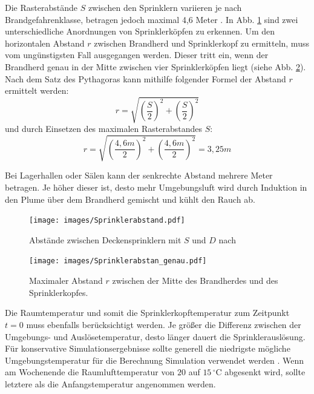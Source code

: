 Die Rasterabstände $S$ zwischen den Sprinklern variieren je nach Brandgefahrenklasse, betragen jedoch maximal 4,6 Meter \cite[S. 100]{VDS4001}. In Abb. \ref{fig:Sprinkleranordnung} sind zwei unterschiedliche Anordnungen von Sprinklerköpfen zu erkennen. 
Um den horizontalen Abstand $r$ zwischen Brandherd und Sprinklerkopf zu ermitteln, muss vom ungünstigsten Fall ausgegangen werden. Dieser tritt ein, wenn der Brandherd genau in der Mitte zwischen vier Sprinklerköpfen liegt (siehe Abb. \ref{fig:Sprinklerabstand_genau}). Nach dem Satz des Pythagoras kann mithilfe folgender Formel der Abstand $r$ ermittelt werden: 
\begin{equation}
    r=\sqrt{\left ( \frac{S}{2} \right )^2+ \left ( \frac{S}{2} \right )^2}
\end{equation}
und durch Einsetzen des maximalen Rasterabstandes $S$:
\begin{equation}
    r=\sqrt{\left ( \frac{4{,}6 m}{2} \right )^2+ \left ( \frac{4{,}6 m}{2} \right )^2}= 3{,}25 m
\end{equation}

Bei Lagerhallen oder Sälen kann der senkrechte Abstand mehrere Meter betragen. Je höher dieser ist, desto mehr Umgebungsluft wird durch Induktion in den Plume über dem Brandherd gemischt und kühlt den Rauch ab. 
\begin{figure}
    \centering
    \texttt{[image: images/Sprinklerabstand.pdf]}
    \caption{Abstände zwischen Deckensprinklern mit $S$ und $D$ nach \cite{DIN12845}}
    \label{fig:Sprinkleranordnung}
\end{figure}
\begin{figure}
    \centering
    \texttt{[image: images/Sprinklerabstan\_genau.pdf]}
    \caption{Maximaler Abstand $r$ zwischen der Mitte des Brandherdes und des Sprinklerkopfes.}
    \label{fig:Sprinklerabstand_genau}
\end{figure}
Die Raumtemperatur und somit die Sprinklerkopftemperatur zum Zeitpunkt $t=0$ muss ebenfalls berücksichtigt werden. Je größer die Differenz zwischen der Umgebungs- und Auslösetemperatur, desto länger dauert die Sprinklerauslösung. Für konservative Simulationsergebnisse sollte generell die niedrigste mögliche Umgebungstemperatur für die Berechnung \bzw Simulation verwendet werden \cite{SFPE5th}. Wenn \zB am Wochenende die Raumlufttemperatur von $20$ auf $15\,^{\circ}\text{C}$ abgesenkt wird, sollte letztere als die Anfangs\-temperatur angenommen werden. 



